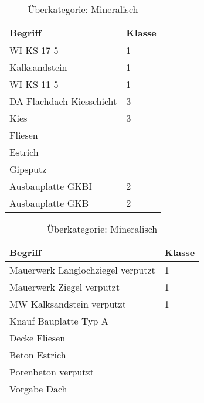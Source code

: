 \begin{table}[h]
	\label{t:evaluation-example5}
	\centering
	\begin{tabular}{|p{}|p{}|}
		\hline
		\textbf{Begriff} & \textbf{Klasse} \\ \hline
		 WI KS 17 5 & 1 \\ \hline
		Kalksandstein & 1 \\ \hline
		WI KS 11 5 & 1 \\ \hline
		DA Flachdach Kiesschicht & 3 \\ \hline
		Kies & 3 \\ \hline
		Fliesen & ~ \\ \hline
		Estrich & ~ \\ \hline
		Gipsputz & ~ \\ \hline
		Ausbauplatte GKBI & 2 \\ \hline
		Ausbauplatte GKB & 2 \\ \hline
	\end{tabular}
	\caption{Überkategorie: Mineralisch}
\end{table}

\begin{table}[h]
	
	\label{t:evaluation-example6}
	\centering
	\begin{tabular}{|p{}|p{}|}
		\hline
		\textbf{Begriff} & \textbf{Klasse} \\ \hline
		 Mauerwerk Langlochziegel verputzt & 1 \\ \hline
		Mauerwerk Ziegel verputzt & 1 \\ \hline
		MW Kalksandstein verputzt & 1 \\ \hline
		Knauf Bauplatte Typ A & ~ \\ \hline
		Decke Fliesen & ~ \\ \hline
		Beton Estrich & ~ \\ \hline
		Porenbeton verputzt & ~ \\ \hline
		Vorgabe Dach & ~ \\ \hline
	\end{tabular}
	\caption{Überkategorie: Mineralisch}
\end{table}

